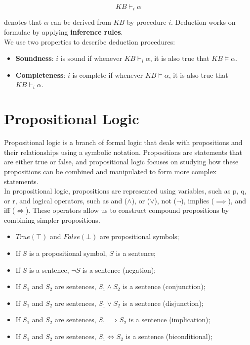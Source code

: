 \documentclass{article}
\begin{document}
\begin{equation*}
    KB \vdash_i \alpha
\end{equation*}

denotes that $\alpha$ can be derived from $KB$ by procedure $i$. Deduction works on formulae by applying \textbf{inference rules}. \\

We use two properties to describe deduction procedures:

\begin{itemize}
    \item \textbf{Soundness}: $i$ is sound if whenever $KB \vdash_i \alpha$, it is also true that $KB \models \alpha$.
    \item \textbf{Completeness}: $i$ is complete if whenever $KB \models \alpha$, it is also true that $KB \vdash_i \alpha$.
\end{itemize}

\newpage

\section{Propositional Logic}

Propositional logic is a branch of formal logic that deals with propositions and their relationships using a symbolic notation. Propositions are statements that are either true or false, and propositional logic focuses on studying how these propositions can be combined and manipulated to form more complex statements. \\

In propositional logic, propositions are represented using variables, such as p, q, or r, and logical operators, such as and ($\land$), or ($\lor$), not ($\neg$), implies ($\implies$), and iff ($\iff$). These operators allow us to construct compound propositions by combining simpler propositions.

\begin{itemize}
    \item $True (\top)$ and $False (\bot)$ are propositional symbols;
    \item If $S$ is a propositional symbol, $S$ is a sentence;
    \item If $S$ is a sentence, $\neg S$ is a sentence (negation);
    \item If $S_1$ and $S_2$ are sentences, $S_1 \land S_2$ is a sentence (conjunction);
    \item If $S_1$ and $S_2$ are sentences, $S_1 \lor S_2$ is a sentence (disjunction);
    \item If $S_1$ and $S_2$ are sentences, $S_1 \implies S_2$ is a sentence (implication);
    \item If $S_1$ and $S_2$ are sentences, $S_1 \iff S_2$ is a sentence (biconditional);
\end{itemize}
\end{document}
